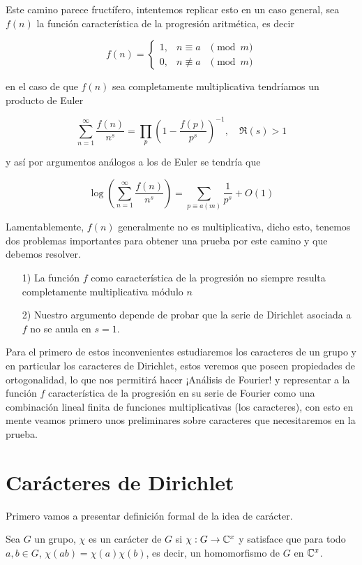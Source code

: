 Este camino parece fructífero, intentemos replicar esto en un caso general, sea $f(n)$ la función característica de la progresión aritmética, es decir

$$
f(n)=\left\{\begin{array}{lll}
1, & n \equiv a & \pmod{m} \\
0, & n \not \equiv a & \pmod{m}
\end{array}\right.
$$

en el caso de que $f(n)$ sea completamente multiplicativa tendríamos un producto de Euler

$$
\sum_{n=1}^{\infty} \frac{f(n)}{n^s}=\prod_p\left(1-\frac{f(p)}{p^s}\right)^{-1}, \quad \Re(s)>1
$$

y así por argumentos análogos a los de Euler se tendría que

$$\log \left(\sum_{n=1}^{\infty} \frac{f(n)}{n^s}\right)=\sum_{p \equiv a(m)} \frac{1}{p^s}+O(1)$$

Lamentablemente, $f(n)$ generalmente no es multiplicativa, dicho esto, tenemos dos problemas importantes para obtener una prueba por este camino y que debemos resolver.

\begin{itemize}
\item[1)] La función $f$ como característica de la progresión no siempre resulta completamente multiplicativa módulo $n$
\item[2)] Nuestro argumento depende de  probar que la serie de Dirichlet asociada a $f$ no se anula en $s=1$.
\end{itemize}

Para el primero de estos inconvenientes estudiaremos los caracteres de un grupo y en particular los caracteres de Dirichlet, estos veremos que poseen propiedades de ortogonalidad, lo que nos permitirá hacer ¡Análisis de Fourier! y representar a la función $f$ característica de la progresión en su serie de Fourier como una combinación lineal finita de funciones multiplicativas (los caracteres), con esto en mente veamos primero unos preliminares sobre caracteres que necesitaremos en la prueba.

\section{Carácteres de Dirichlet}

Primero vamos a presentar definición formal de la idea de carácter.\\

\begin{definition}
Sea $G$ un grupo, $\chi$ es un carácter de $G$ si $\chi: G\to \mathbb{C}^{x}$ y satisface que para todo $a,b\in G$, $\chi(ab)=\chi(a)\chi(b)$, es decir, un homomorfismo de $G$ en $\mathbb{C}^{x}$.
\end{definition}

